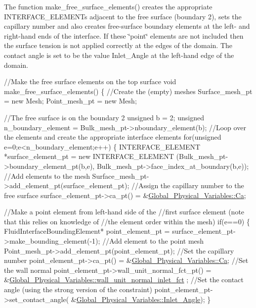 The function {\ttfamily make\+\_\+free\+\_\+surface\+\_\+elements()} creates the appropriate {\ttfamily I\+N\+T\+E\+R\+F\+A\+C\+E\+\_\+\+E\+L\+E\+M\+E\+N\+Ts} adjacent to the free surface (boundary 2), sets the capillary number and also creates free-\/surface boundary elements at the left-\/ and right-\/hand ends of the interface. If these \char`\"{}point\char`\"{} elements are not included then the surface tension is not applied correctly at the edges of the domain. The contact angle is set to be the value {\ttfamily Inlet\+\_\+\+Angle} at the left-\/hand edge of the domain. 
\begin{DoxyCodeInclude}
 \textcolor{comment}{//Make the free surface elements on the top surface}
 \textcolor{keywordtype}{void} make\_free\_surface\_elements()
  \{
   \textcolor{comment}{//Create the (empty) meshes}
   Surface\_mesh\_pt = \textcolor{keyword}{new} Mesh;
   Point\_mesh\_pt = \textcolor{keyword}{new} Mesh;

   \textcolor{comment}{//The free surface is on the boundary 2}
   \textcolor{keywordtype}{unsigned} b = 2;
   \textcolor{keywordtype}{unsigned} n\_boundary\_element = Bulk\_mesh\_pt->nboundary\_element(b);
   \textcolor{comment}{//Loop over the elements and create the appropriate interface elements}
   \textcolor{keywordflow}{for}(\textcolor{keywordtype}{unsigned} e=0;e<n\_boundary\_element;e++)
    \{
     INTERFACE\_ELEMENT *surface\_element\_pt =
      \textcolor{keyword}{new} INTERFACE\_ELEMENT
      (Bulk\_mesh\_pt->boundary\_element\_pt(b,e),
       Bulk\_mesh\_pt->face\_index\_at\_boundary(b,e));
     \textcolor{comment}{//Add elements to the mesh}
     Surface\_mesh\_pt->add\_element\_pt(surface\_element\_pt);
     \textcolor{comment}{//Assign the capillary number to the free surface}
     surface\_element\_pt->ca\_pt() = 
      &\hyperlink{namespaceGlobal__Physical__Variables_a8b32b93d2e546f9375ec418474107838}{Global\_Physical\_Variables::Ca};
     
     \textcolor{comment}{//Make a point element from left-hand side of the }
     \textcolor{comment}{//first surface element (note that this relies on knowledge of }
     \textcolor{comment}{//the element order within the mesh)}
     \textcolor{keywordflow}{if}(e==0)
      \{
       FluidInterfaceBoundingElement* point\_element\_pt =
        surface\_element\_pt->make\_bounding\_element(-1);
       \textcolor{comment}{//Add element to the point mesh}
       Point\_mesh\_pt->add\_element\_pt(point\_element\_pt);
       \textcolor{comment}{//Set the capillary number}
       point\_element\_pt->ca\_pt() = &\hyperlink{namespaceGlobal__Physical__Variables_a8b32b93d2e546f9375ec418474107838}{Global\_Physical\_Variables::Ca};
       \textcolor{comment}{//Set the wall normal}
       point\_element\_pt->wall\_unit\_normal\_fct\_pt() = 
        &\hyperlink{namespaceGlobal__Physical__Variables_aa26e74c1f9f93f8212e45380f55fb562}{Global\_Physical\_Variables::wall\_unit\_normal\_inlet\_fct}
      ;
       \textcolor{comment}{//Set the contact angle (using the strong version of the constraint)}
       point\_element\_pt->set\_contact\_angle(
        &\hyperlink{namespaceGlobal__Physical__Variables_a1c3587461447262715bd444ac91a29c9}{Global\_Physical\_Variables::Inlet\_Angle});
      \}
     

\end{DoxyCodeInclude}
